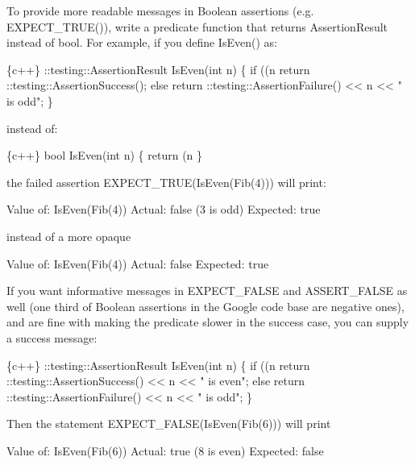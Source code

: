 To provide more readable messages in Boolean assertions (e.\+g. {\ttfamily E\+X\+P\+E\+C\+T\+\_\+\+T\+R\+U\+E()}), write a predicate function that returns {\ttfamily Assertion\+Result} instead of {\ttfamily bool}. For example, if you define {\ttfamily Is\+Even()} as\+:


\begin{DoxyCode}
\{c++\}
::testing::AssertionResult IsEven(int n) \{
  if ((n %
     return ::testing::AssertionSuccess();
  else
     return ::testing::AssertionFailure() << n << " is odd";
\}
\end{DoxyCode}


instead of\+:


\begin{DoxyCode}
\{c++\}
bool IsEven(int n) \{
  return (n %
\}
\end{DoxyCode}


the failed assertion {\ttfamily E\+X\+P\+E\+C\+T\+\_\+\+T\+R\+UE(Is\+Even(\+Fib(4)))} will print\+:


\begin{DoxyCode}
Value of: IsEven(Fib(4))
  Actual: false (3 is odd)
Expected: true
\end{DoxyCode}


instead of a more opaque


\begin{DoxyCode}
Value of: IsEven(Fib(4))
  Actual: false
Expected: true
\end{DoxyCode}


If you want informative messages in {\ttfamily E\+X\+P\+E\+C\+T\+\_\+\+F\+A\+L\+SE} and {\ttfamily A\+S\+S\+E\+R\+T\+\_\+\+F\+A\+L\+SE} as well (one third of Boolean assertions in the Google code base are negative ones), and are fine with making the predicate slower in the success case, you can supply a success message\+:


\begin{DoxyCode}
\{c++\}
::testing::AssertionResult IsEven(int n) \{
  if ((n %
     return ::testing::AssertionSuccess() << n << " is even";
  else
     return ::testing::AssertionFailure() << n << " is odd";
\}
\end{DoxyCode}


Then the statement {\ttfamily E\+X\+P\+E\+C\+T\+\_\+\+F\+A\+L\+SE(Is\+Even(\+Fib(6)))} will print


\begin{DoxyCode}
Value of: IsEven(Fib(6))
   Actual: true (8 is even)
Expected: false
\end{DoxyCode}


